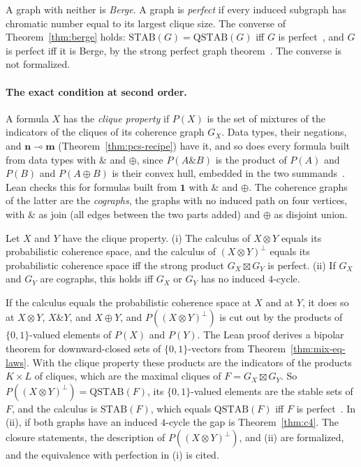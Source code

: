 \noindent
A graph with neither is \emph{Berge}. A graph is \emph{perfect} if every
induced subgraph has chromatic number equal to its largest clique size.
The converse of Theorem~\ref{thm:berge} holds: $\mathrm{STAB}(G) =
\mathrm{QSTAB}(G)$ iff $G$ is perfect~\cite{chvatal1975,lovasz1972}, and
$G$ is perfect iff it is Berge, by the strong perfect graph
theorem~\cite{chudnovsky2006}. The converse is not formalized.

\paragraph{The exact condition at second order.}
A formula $X$ has the \emph{clique property} if $P(X)$ is the set of
mixtures of the indicators of the cliques of its coherence graph $G_X$.
Data types, their negations, and $\mathbf{n} \multimap \mathbf{m}$
(Theorem~\ref{thm:pcs-recipe}) have it, and so does every formula built
from data types with $\mathbin{\&}$ and $\oplus$, since $P(A \mathbin{\&}
B)$ is the product of $P(A)$ and $P(B)$ and $P(A \oplus B)$ is their convex
hull, embedded in the two summands~\cite{danos-ehrhard2011}. Lean
checks this for formulas built from $\mathbf{1}$ with $\mathbin{\&}$
and $\oplus$. The coherence graphs of the latter
are the \emph{cographs}, the graphs with no induced path on four
vertices, with $\mathbin{\&}$ as join (all edges between the two parts
added) and $\oplus$ as disjoint union.

\begin{theorem}
\label{thm:second-exact}
Let $X$ and $Y$ have the clique property.
(i) The calculus of $X \otimes Y$ equals its probabilistic coherence
space, and the calculus of $(X \otimes Y)^{\perp}$ equals its
probabilistic coherence space iff the strong product $G_X \boxtimes G_Y$
is perfect.
(ii) If $G_X$ and $G_Y$ are cographs, this holds iff $G_X$ or $G_Y$ has no
induced $4$-cycle.
\end{theorem}

\noindent
If the calculus equals the probabilistic coherence space at $X$ and at
$Y$, it does so at $X \otimes Y$, $X \mathbin{\&} Y$, and $X \oplus Y$,
and $P((X \otimes Y)^{\perp})$ is cut out by the products of
$\{0,1\}$-valued elements of $P(X)$ and $P(Y)$. The Lean proof derives a
bipolar theorem for downward-closed sets of $\{0,1\}$-vectors from
Theorem~\ref{thm:mix-eq-laws}. With the clique property these products
are the indicators of the products $K \times L$ of cliques, which are the
maximal cliques of $F = G_X \boxtimes G_Y$. So $P((X \otimes Y)^{\perp})
= \mathrm{QSTAB}(F)$, its $\{0,1\}$-valued elements are the stable sets of
$F$, and the calculus is $\mathrm{STAB}(F)$, which equals
$\mathrm{QSTAB}(F)$ iff $F$ is perfect~\cite{lovasz1972,chvatal1975}. In
(ii), if both graphs have an induced $4$-cycle the gap is
Theorem~\ref{thm:c4}. The closure statements, the description of
$P((X \otimes Y)^{\perp})$, and (ii) are formalized, and the equivalence
with perfection in (i) is cited.

